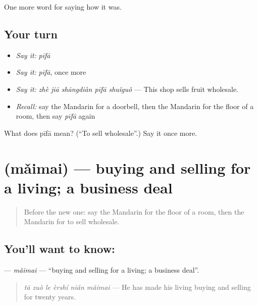 \begin{grammarlens}[title={What you've built}]
One more word for saying how it was.
\end{grammarlens}

\subsection*{Your turn}
\begin{itemize}
\raggedright
  \item \emph{Say it:} \emph{pīfā}
  \item \emph{Say it:} \emph{pīfā}, once more
  \item \emph{Say it:} \emph{zhè jiā shāngdiàn pīfā shuǐguǒ} — This shop sells fruit wholesale.
  \item \emph{Recall:} say the Mandarin for a doorbell, then the Mandarin for the floor of a room, then say \emph{pīfā} again
\end{itemize}

\begin{tcolorbox}[breakable,colback=teal!4,colframe=teal!35!black,title={Before you move on}]
What does pīfā mean? (\textquotedblleft{}To sell wholesale\textquotedblright{}.) Say it once more.
\end{tcolorbox}
\section[\texorpdfstring{\zh{买卖} (mǎimai)}{买卖 (mǎimai)}]{ (mǎimai) — buying and selling for a living; a business deal}

\label{lesson:ZH-C523-maimai}



\begin{quote}
Before the new one: say the Mandarin for the floor of a room, then the Mandarin for to sell wholesale.
\end{quote}

\subsection*{You'll want to know: }
\textbf{} — \emph{mǎimai} — \textquotedblleft{}buying and selling for a living; a business deal\textquotedblright{}.

\begin{quote}
\textbf{} \emph{tā zuò le èrshí nián mǎimai} — He has made his living buying and selling for twenty years.
\end{quote}

